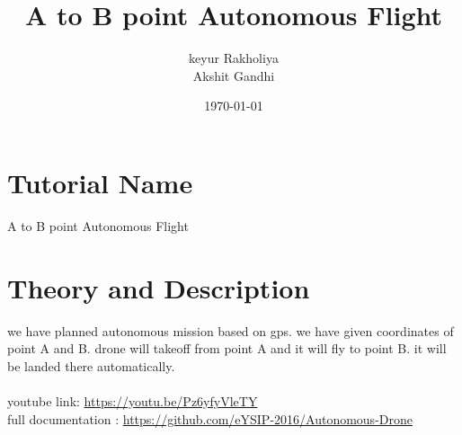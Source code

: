 \documentclass[11pt,a4paper]{article}
\title{A to B point Autonomous Flight}
\author{keyur Rakholiya \\ Akshit Gandhi}
\date{\today}
\begin{document}
	\maketitle
	\newpage
	\tableofcontents
	\newpage
	\section{Tutorial Name}
	\hspace{0.5in}A to B point Autonomous Flight
	
	


	


	\section{Theory and Description}
		we have planned autonomous mission based on gps. we have given coordinates of point A and B. drone will takeoff from point A and it will fly to point B. it will be landed there automatically.\\
		\\
		youtube link: \url{https://youtu.be/Pz6yfyVleTY}
		\\
		full documentation : \url{https://github.com/eYSIP-2016/Autonomous-Drone}
		

	
\end{document}
